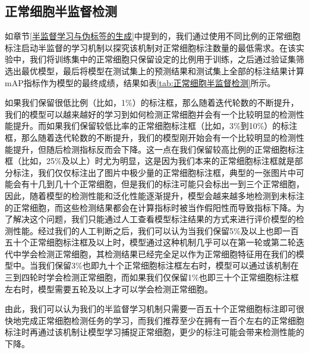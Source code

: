 \subsection{正常细胞半监督检测}
\par 如章节\ref{半监督学习与伪标签的生成}中提到的，我们通过使用不同比例的正常细胞标注启动半监督的学习机制以探究该机制对正常细胞标注数量的最低需求。在该实验中，我们将训练集中的正常细胞只保留设定的比例用于训练，之后通过验证集筛选出最优模型，最后将模型在测试集上的预测结果和测试集上全部的标注结果计算mAP指标作为模型的最终成绩，结果如表\ref{tab:正常细胞半监督检测}所示。
\par 如果我们保留很低比例（比如，1\%）的标注框，那么随着迭代轮数的不断提升，我们的模型可以越来越好的学习到如何检测正常细胞并会有一个比较明显的检测性能提升。而如果我们保留较低比率的正常细胞标注框（比如，3\%到10\%）的标注框，那么随着迭代轮数的不断提升，我们的模型刚开始会有一个比较明显的检测性能提升，但随后检测指标反而会下降。这一点在我们保留较高比例的正常细胞标注框（比如，25\%及以上）时尤为明显，这是因为我们本来的正常细胞标注框就是部分标注，我们仅仅标注出了图片中极少量的正常细胞标注框，典型的一张图片中可能会有十几到几十个正常细胞，但是我们的标注可能只会标出一到三个正常细胞，因此，随着模型的检测性能和泛化性能逐渐提升，模型会越来越多地检测到未标注的正常细胞，而这些检测结果都会在计算指标时被当作假阳性而导致指标下降。为了解决这个问题，我们只能通过人工查看模型标注结果的方式来进行评价模型的检测性能。经过我们的人工判断之后，我们可以认为当我们保留5\%及以上也即一百五十个正常细胞标注框及以上时，模型通过这种机制几乎可以在第一轮或第二轮迭代中学会检测正常细胞，其检测结果已经完全足以作为正常细胞特征用在我们的模型中。当我们保留3\%也即九十个正常细胞标注框左右时，模型可以通过该机制在三到四轮时学会检测正常细胞，而如果我们仅保留1\%也即三十个正常细胞标注框左右时，模型需要五轮及以上才可以学会检测正常细胞。
\par 由此，我们可以认为我们的半监督学习机制只需要一百五十个正常细胞标注即可很快地完成正常细胞检测任务的学习，而我们推荐至少在拥有一百个左右的正常细胞标注时再通过该机制让模型学习捕捉正常细胞，更少的标注可能会带来检测性能的下降。

